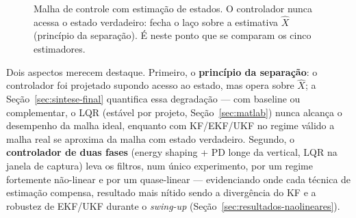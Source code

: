 \documentclass[brazil, 12pt]{article}
\begin{document}
\begin{figure}[H]
\centering
{}
\caption{Malha de controle com estimação de estados. O controlador nunca acessa
o estado verdadeiro: fecha o laço sobre a estimativa $\hat{X}$ (princípio da
separação). É neste ponto que se comparam os cinco estimadores.}
\label{fig:malha}
\end{figure}

Dois aspectos merecem destaque. Primeiro, o \textbf{princípio da separação}:
o controlador foi projetado supondo acesso ao estado, mas opera sobre
$\hat{X}$; a Seção~\ref{sec:sintese-final} quantifica essa degradação — com
baseline ou complementar, o LQR (estável por projeto,
Seção~\ref{sec:matlab}) nunca alcança o desempenho da malha ideal, enquanto
com KF/EKF/UKF no regime válido a malha real se aproxima da malha com estado
verdadeiro. Segundo, o \textbf{controlador de duas fases} (energy shaping +
PD longe da vertical, LQR na janela de captura) leva os filtros, num único
experimento, por um regime fortemente não-linear e por um quase-linear —
evidenciando onde cada técnica de estimação compensa, resultado mais nítido
sendo a divergência do KF e a robustez de EKF/UKF durante o \emph{swing-up}
(Seção~\ref{sec:resultados-naolineares}).
\end{document}
